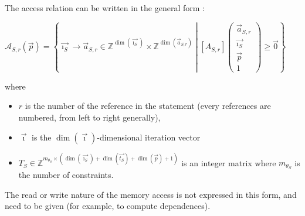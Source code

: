 \documentclass[paper=a4, fontsize=11pt]{scrartcl}
\numberwithin{equation}{section}        %
\numberwithin{figure}{section}          %
\numberwithin{table}{section}               %
\begin{document}
        The access relation can be written in the general form :
        \begin{center}
            $\mathcal{A}_{S,r}(\vec{p}) = 
            \left\{
                \vec{\imath_S} \to \vec{a}_{S,r} \in \mathbb{Z}^{\dim(\vec{\imath_S})}\times\mathbb{Z}^{\dim(\vec{a}_{S,r})}
                \middle|
                \left[A_{S,r}\right]\left(\begin{array}{c}\vec{a}_{S,r}\\\vec{\imath_S}\\\vec{p}\\1\end{array}\right)
                \geq \vec{0}
            \right\}$
        \end{center}
        where 
        \begin{itemize}
            \item $r$ is the number of the reference in the statement (every references are
                numbered, from left to right generally),
            \item $\vec{\imath}$ is the $\dim(\vec{\imath})$-dimensional iteration vector
            \item $T_S \in \mathbb{Z}^{m_{\theta_S}\times(\dim(\vec{\imath_S})+\dim(\vec{t_S})+\dim(\vec{p})+1)}$
                is an integer matrix where $m_{\theta_S}$ is the number of constraints.
        \end{itemize}

        The read or write nature of the memory access is not expressed in this form,
        and need to be given (for example, to compute dependences).
\end{document}
